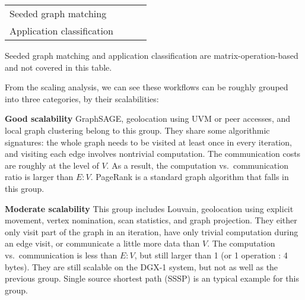\documentclass[10pt,oneside]{memoir}
\begin{document}
\begin{longtable}[]{@{}llll@{}}
\begin{minipage}[t]{0.25\columnwidth}
Seeded graph matching\strut
\end{minipage} & \begin{minipage}[t]{0.37\columnwidth}\raggedright
\strut
\end{minipage} & \begin{minipage}[t]{0.12\columnwidth}\raggedright
\strut
\end{minipage} & \begin{minipage}[t]{0.14\columnwidth}\raggedright
\strut
\end{minipage}\tabularnewline
\begin{minipage}[t]{0.25\columnwidth}\raggedright
Application classification\strut
\end{minipage} & \begin{minipage}[t]{0.37\columnwidth}\raggedright
\strut
\end{minipage} & \begin{minipage}[t]{0.12\columnwidth}\raggedright
\strut
\end{minipage} & \begin{minipage}[t]{0.14\columnwidth}\raggedright
\strut
\end{minipage}\tabularnewline
\bottomrule
\end{longtable}

Seeded graph matching and application classification are
matrix-operation-based and not covered in this table.

From the scaling analysis, we can see these workflows can be roughly
grouped into three categories, by their scalabilities:

\textbf{Good scalability} GraphSAGE, geolocation using UVM or peer
accesses, and local graph clustering belong to this group. They share
some algorithmic signatures: the whole graph needs to be visited at
least once in every iteration, and visiting each edge involves
nontrivial computation. The communication costs are roughly at the level
of \(V\). As a result, the computation vs.~communication ratio is larger
than \(E : V\). PageRank is a standard graph algorithm that falls in
this group.

\textbf{Moderate scalability} This group includes Louvain, geolocation
using explicit movement, vertex nomination, scan statistics, and graph
projection. They either only visit part of the graph in an iteration,
have only trivial computation during an edge visit, or communicate a
little more data than \(V\). The computation vs.~communication is less
than \(E : V\), but still larger than 1 (or 1 operation : 4 bytes). They
are still scalable on the DGX-1 system, but not as well as the previous
group. Single source shortest path (SSSP) is an typical example for this
group.
\end{document}
